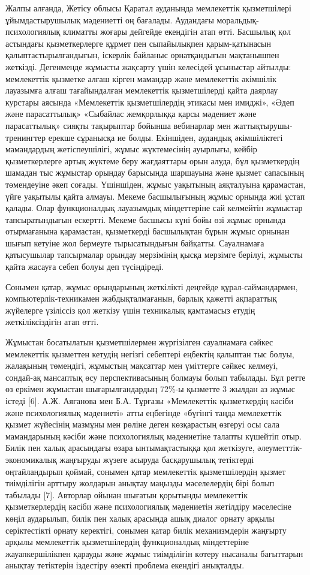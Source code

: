 Жалпы алғанда, Жетісу облысы Қаратал ауданында мемлекеттік қызметшілері
ұйымдастырушылық мәдениетті оң бағалады. Аудандағы
моральдық-психологиялық климатты жоғары дейгейде екендігін атап өтті.
Басшылық қол астындағы қызметкерлерге құрмет пен сыпайылықпен
қарым-қатынасын қалыптастырылғандығын, іскерлік байланыс орнатқандығын
мақтанышпен жеткізді. Дегенменде жұмысты жақсарту үшін келесідей
ұсыныстар айтылды: мемлекеттік қызметке алғаш кірген мамандар және
мемлекеттік әкімшілік лауазымға алғаш тағайындалған мемлекеттік
қызметшілерді қайта даярлау курстары аясында «Мемлекеттік қызметшілердің
этикасы мен имиджі», «Әдеп және парасаттылық» «Сыбайлас жемқорлыққа
қарсы мәдениет және парасаттылық» сияқты тақырыптар бойынша вебинарлар
мен жаттықтырушы-тренингтер ерекше сұранысқа ие болды. Екіншіден,
аудандық әкімшіліктегі мамандардың жетіспеушілігі, жұмыс жүктемесінің
ауырлығы, кейбір қызметкерлерге артық жүктеме беру жағдаяттары орын
алуда, бұл қызметкердің шамадан тыс жұмыстар орындау барысында шаршауына
және қызмет сапасының төмендеуіне әкеп соғады. Үшіншіден, жұмыс
уақытының аяқталуына қарамастан, үйге уақытылы қайта алмауы. Мекеме
басшылығының жұмыс орнында жиі ұстап қалады. Олар функционалдық
лауазымдық міндеттеріне сай келмейтін жұмыстар тапсыратындығын ескертті.
Мекеме басшысы күні бойы өзі жұмыс орнында отырмағанына қарамастан,
қызметкерді басшылықтан бұрын жұмыс орнынан шығып кетуіне жол бермеуге
тырысатындығын байқатты. Сауалнамаға қатысушылар тапсырмалар орындау
мерзімінің қысқа мерзімге берілуі, жұмысты қайта жасауға себеп болуы деп
түсіндіреді.

Сонымен қатар, жұмыс орындарының жеткілікті деңгейде құрал-саймандармен,
компьютерлік-техникамен жабдықталмағанын, барлық қажетті ақпараттық
жүйелерге үзіліссіз қол жеткізу үшін техникалық қамтамасыз етудің
жеткіліксіздігін атап өтті.

Жұмыстан босатылатын қызметшілермен жүргізілген сауалнамаға сәйкес
мемлекеттік қызметтен кетудің негізгі себептері еңбектің қалыптан тыс
болуы, жалақының төмендігі, жұмыстың мақсаттар мен үміттерге сәйкес
келмеуі, сондай-ақ мансаптық өсу перспективасының болмауы болып
табылады. Бұл ретте өз еркімен жұмыстан шығарылғандардың 72\%-ы қызметте
3 жылдан аз жұмыс істеді {[}6{]}. А.Ж. Аяғанова мен Б.А. Тұрғазы
«Мемлекеттік қызметкердің кәсіби және психологиялық мәдениеті» атты
еңбегінде «бүгінгі таңда мемлекеттік қызмет жүйесінің мазмұны мен рөліне
деген көзқарастың өзгеруі осы сала мамандарының кәсіби және
психологиялық мәдениетіне талапты күшейтіп отыр. Билік пен халық
арасындағы өзара ынтымақтастыққа қол жеткізуге, әлеуметттік-экономикалық
жаңғыруды жүзеге асыруда басқарушылық тетіктерді оңтайландырып қоймай,
сонымен қатар мемлекеттік қызметшілердің қызмет тиімділігін арттыру
жолдарын анықтау маңызды мәселелердің бірі болып табылады {[}7{]}.
Авторлар ойынан шығатын қорытынды мемлекеттік қызметкерлердің кәсіби
және психологиялық мәдениетін жетілдіру мәселесіне көңіл аударылып,
билік пен халық арасында ашық диалог орнату арқылы серіктестікті орнату
керектігі, сонымен қатар билік механизмдерін жаңғырту арқылы мемлекеттік
қызметшілердің функционалдық міндеттеріне жауапкершілікпен қарауды және
жұмыс тиімділігін көтеру нысаналы бағыттарын анықтау тетіктерін
іздестіру өзекті проблема екендігі анықталды.

